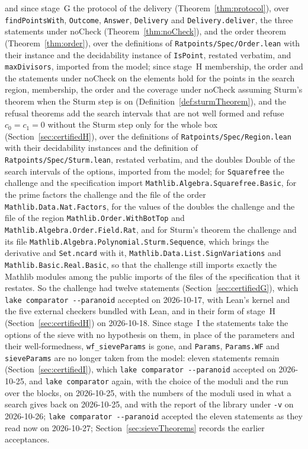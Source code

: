 and since stage~G the protocol of the delivery (Theorem~\ref{thm:protocol}), over
\verb|findPointsWith|, \verb|Outcome|, \verb|Answer|, \verb|Delivery| and \verb|Delivery.deliver|,
the three statements under $\mathrm{noCheck}$ (Theorem~\ref{thm:noCheck}), and the order theorem
(Theorem~\ref{thm:order}), over the definitions of \verb|Ratpoints/Spec/Order.lean| with their
instance and the decidability instance of \verb|IsPoint|, restated verbatim, and \verb|maxDivisors|,
imported from the model; since stage~H membership, the order and the statements under
$\mathrm{noCheck}$ on the elements hold for the points in the search region, membership, the order
and the coverage under $\mathrm{noCheck}$ assuming Sturm's theorem when the Sturm step is on
(Definition~\ref{def:sturmTheorem}), and the refusal theorems add the search intervals that are not
well formed and refuse $c_0 = c_1 = 0$ without the Sturm step only for the whole box
(Section~\ref{sec:certifiedH}), over the definitions of \verb|Ratpoints/Spec/Region.lean| with their
decidability instances and the definition of \verb|Ratpoints/Spec/Sturm.lean|, restated verbatim,
and the doubles $\mathrm{Double}$ of the search intervals of the options, imported from the model;
for \verb|Squarefree| the challenge and the specification import
\verb|Mathlib.Algebra.Squarefree.Basic|, for the prime factors the challenge and the file of the
order \verb|Mathlib.Data.Nat.Factors|, for the values of the doubles the challenge and the file of
the region \verb|Mathlib.Order.WithBotTop| and \verb|Mathlib.Algebra.Order.Field.Rat|, and for
Sturm's theorem the challenge and its file \verb|Mathlib.Algebra.Polynomial.Sturm.Sequence|, which
brings the derivative and \verb|Set.ncard| with it, \verb|Mathlib.Data.List.SignVariations| and
\verb|Mathlib.Basic.Real.Basic|, so that the challenge still imports exactly the Mathlib modules
among the public imports of the files of the specification that it restates. So the challenge had
twelve statements (Section~\ref{sec:certifiedG}), which \verb|lake comparator --paranoid| accepted
on 2026-10-17, with Lean's kernel and the five external checkers bundled with Lean, and in their
form of stage~H (Section~\ref{sec:certifiedH}) on 2026-10-18. Since stage~I the statements take the
options of the sieve with no hypothesis on them, in place of the parameters and their
well-formedness, \verb|wf_sieveParams| is gone, and \verb|Params|, \verb|Params.WF| and
\verb|sieveParams| are no longer taken from the model: eleven statements remain
(Section~\ref{sec:certifiedI}), which \verb|lake comparator --paranoid| accepted on 2026-10-25, and
\verb|lake comparator| again, with the choice of the moduli and the run over the blocks, on
2026-10-25, with the numbers of the moduli used in what a search gives back on 2026-10-25, and with
the report of the library under \verb|-v| on 2026-10-26; \verb|lake comparator --paranoid| accepted
the eleven statements as they read now on 2026-10-27; Section~\ref{sec:sieveTheorems} records the
earlier acceptances.

